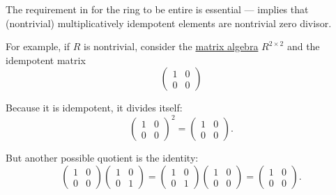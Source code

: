 \begin{example}\label{ex:nonunique_divisor}
  The requirement in  for the ring to be entire is essential ---  implies that (nontrivial) multiplicatively idempotent elements are nontrivial zero divisor.

  For example, if \( R \) is nontrivial, consider the \hyperref[thm:matrix_algebra]{matrix algebra} \( R^{2 \times 2} \) and the idempotent matrix
  \begin{equation*}
    \begin{pmatrix}
      1 & 0 \\
      0 & 0
    \end{pmatrix}
  \end{equation*}

  Because it is idempotent, it divides itself:
  \begin{equation*}
    \begin{pmatrix}
      1 & 0 \\
      0 & 0
    \end{pmatrix}^2
    =
    \begin{pmatrix}
      1 & 0 \\
      0 & 0
    \end{pmatrix}.
  \end{equation*}

  But another possible quotient is the identity:
  \begin{equation*}
    \begin{pmatrix}
      1 & 0 \\
      0 & 0
    \end{pmatrix}
    \begin{pmatrix}
      1 & 0 \\
      0 & 1
    \end{pmatrix}
    =
    \begin{pmatrix}
      1 & 0 \\
      0 & 1
    \end{pmatrix}
    \begin{pmatrix}
      1 & 0 \\
      0 & 0
    \end{pmatrix}
    =
    \begin{pmatrix}
      1 & 0 \\
      0 & 0
    \end{pmatrix}.
  \end{equation*}
\end{example}

